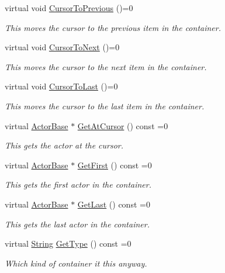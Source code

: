 \begin{DoxyCompactItemize}
virtual void \hyperlink{classphys_1_1ActorContainerBase_a7c424168c0bbd973b283a083714123b3}{CursorToPrevious} ()=0
\begin{DoxyCompactList}\small\item\em This moves the cursor to the previous item in the container. \item\end{DoxyCompactList}\item 
virtual void \hyperlink{classphys_1_1ActorContainerBase_a1aa337456a4e74cb5740dbae08778072}{CursorToNext} ()=0
\begin{DoxyCompactList}\small\item\em This moves the cursor to the next item in the container. \item\end{DoxyCompactList}\item 
virtual void \hyperlink{classphys_1_1ActorContainerBase_afad072e018a04c190e5e5fb93b82b354}{CursorToLast} ()=0
\begin{DoxyCompactList}\small\item\em This moves the cursor to the last item in the container. \item\end{DoxyCompactList}\item 
virtual \hyperlink{classphys_1_1ActorBase}{ActorBase} $\ast$ \hyperlink{classphys_1_1ActorContainerBase_a2c8fb86a9e188aece105b2a753ccc19a}{GetAtCursor} () const =0
\begin{DoxyCompactList}\small\item\em This gets the actor at the cursor. \item\end{DoxyCompactList}\item 
virtual \hyperlink{classphys_1_1ActorBase}{ActorBase} $\ast$ \hyperlink{classphys_1_1ActorContainerBase_ae703482d84a9c6726e28a8f26418b161}{GetFirst} () const =0
\begin{DoxyCompactList}\small\item\em This gets the first actor in the container. \item\end{DoxyCompactList}\item 
virtual \hyperlink{classphys_1_1ActorBase}{ActorBase} $\ast$ \hyperlink{classphys_1_1ActorContainerBase_a8efeffd5ae22085fe01af791b3ea559e}{GetLast} () const =0
\begin{DoxyCompactList}\small\item\em This gets the last actor in the container. \item\end{DoxyCompactList}\item 
virtual \hyperlink{namespacephys_aa03900411993de7fbfec4789bc1d392e}{String} \hyperlink{classphys_1_1ActorContainerBase_a526dab176597858680490d128d0584a3}{GetType} () const =0
\begin{DoxyCompactList}\small\item\em Which kind of container it this anyway. \item\end{DoxyCompactList}\end{DoxyCompactItemize}


